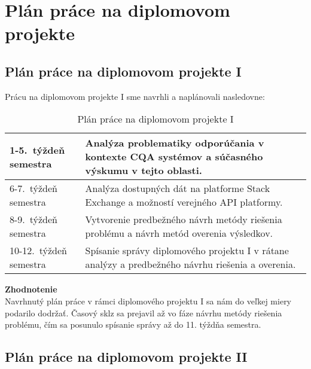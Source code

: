 \newpage
\thispagestyle{plain}

\chapter{Plán práce na diplomovom projekte}

\section{Plán práce na diplomovom projekte I}

Prácu na diplomovom projekte I sme navrhli a naplánovali nasledovne:

\begin{table}[h]
\centering
\caption{Plán práce na diplomovom projekte I}
\begin{tabular}{|m{2.3cm}|m{12cm}|}
\hline
1-5.~týždeň semestra   & Analýza problematiky odporúčania v kontexte CQA systémov a súčasného výskumu v tejto oblasti. \\ \hline
6-7.~týždeň semestra   & Analýza dostupných dát na platforme Stack Exchange a možností verejného API platformy. \\ \hline
8-9.~týždeň semestra   & Vytvorenie predbežného návrh metódy riešenia problému a návrh metód overenia výsledkov. \\ \hline
10-12.~týždeň semestra & Spísanie správy diplomového projektu I v rátane analýzy a predbežného návrhu riešenia a overenia. \\ \hline
\end{tabular}
\end{table}

\textbf{Zhodnotenie}\\
Navrhnutý plán práce v rámci diplomového projektu I sa nám do veľkej miery podarilo dodržať. Časový sklz sa prejavil až
vo fáze návrhu metódy riešenia problému, čím sa posunulo spísanie správy až do 11. týždňa semestra.

\newpage
\section{Plán práce na diplomovom projekte II}

